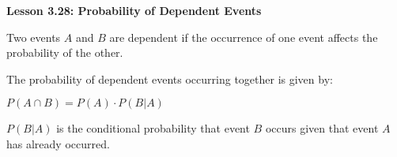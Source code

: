 \begin{center}
\textbf{Lesson 3.28: Probability of Dependent Events}
\end{center}

\vspace*{-1.5ex}

\noindent Two events \( A \) and \( B \) are dependent if the occurrence of one event affects the probability of the other.

\noindent The probability of dependent events occurring together is given by:

{\centering $ P(A \cap B) = P(A) \cdot P(B|A) $\par}

\noindent \( P(B|A) \) is the conditional probability that event \( B \) occurs given that event \( A \) has already occurred.


